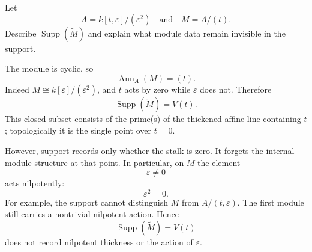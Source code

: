 \begin{problem}\label{prob:vi33-09}
Let
\[
A=k[t,\varepsilon]/(\varepsilon^2)
\quad\text{and}\quad
M=A/(t).
\]
Describe \(\operatorname{Supp}(\widetilde M)\) and explain what module data remain invisible in the support.
\end{problem}

\ifdefined\FullProblemDossiers
\begin{solution}
The module is cyclic, so
\[
\operatorname{Ann}_A(M)=(t).
\]
Indeed \(M\cong k[\varepsilon]/(\varepsilon^2)\), and \(t\) acts by zero while \(\varepsilon\) does not. Therefore
\[
\operatorname{Supp}(\widetilde M)
=
V(t).
\]
This closed subset consists of the prime(s) of the thickened affine line containing \(t\); topologically it is the
single point over \(t=0\).

However, support records only whether the stalk is zero.  It forgets the internal module structure at that point.
In particular, on \(M\) the element
\[
\varepsilon\ne0
\]
acts nilpotently:
\[
\varepsilon^2=0.
\]
For example, the support cannot distinguish \(M\) from \(A/(t,\varepsilon)\).  The first module still carries
a nontrivial nilpotent action. Hence
\[
\boxed{\operatorname{Supp}(\widetilde M)=V(t)}
\]
does not record nilpotent thickness or the action of \(\varepsilon\).
\end{solution}
\fi
